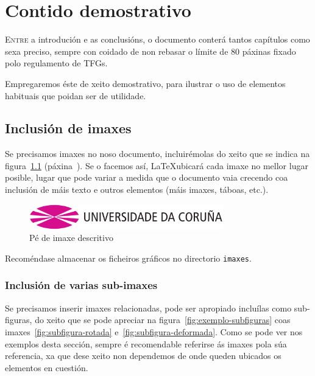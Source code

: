 \chapter{Contido demostrativo}
\label{chap:demo}

\lettrine{E}{ntre} a introdución e as conclusións, o documento conterá
tantos capítulos como sexa preciso, sempre con coidado de non rebasar
o límite de 80 páxinas fixado polo regulamento de TFGs.

Empregaremos éste de xeito demostrativo, para ilustrar o uso de
elementos habituais que poidan ser de utilidade.

\section{Inclusión de imaxes}

Se precisamos imaxes no noso documento, incluirémolas do xeito que se
indica na figura~\ref{fig:exemplo} (páxina~\pageref{fig:exemplo}). Se
o facemos así, \LaTeX ubicará cada imaxe no mellor lugar posible,
lugar que pode variar a medida que o documento vaia crecendo coa
inclusión de máis texto e outros elementos (máis imaxes, táboas,
etc.).

\begin{figure}[hp!]
  \centering
  \includegraphics[width=0.75\textwidth]{imaxes/udc.png}
  \caption{Pé de imaxe descritivo}
  \label{fig:exemplo}
\end{figure}

Recoméndase almacenar os ficheiros gráficos no directorio
\texttt{imaxes}.

\subsection{Inclusión de varias sub-imaxes}

Se precisamos inserir imaxes relacionadas, pode ser apropiado
incluílas como sub-figuras, do xeito que se pode apreciar na
figura~\ref{fig:exemplo-subfiguras} coas
imaxes~\ref{fig:subfigura-rotada}
e~\ref{fig:subfigura-deformada}. Como se pode ver nos exemplos desta
sección, sempre é recomendable referirse ás imaxes pola súa
referencia, xa que dese xeito non dependemos de onde queden ubicados
os elementos en cuestión.

